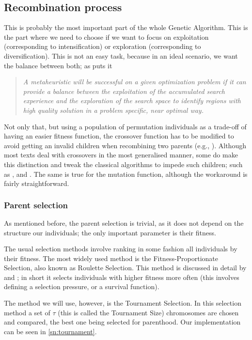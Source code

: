 \subsection{Recombination process}\label{sec:recombination}
This is probably the most important part of the whole Genetic Algorithm. This is the part where we need to choose if we want to focus on exploitation (corresponding to intensification) or exploration (corresponding to diversification). This is not an easy task, because in an ideal scenario, we want the balance between both; as \textcite{Stutzle1999} puts it
\begin{quotation}
	\emph{A metaheuristic will be successful on a given optimization problem if it can provide a balance between the exploitation of the accumulated search experience and the exploration of the search space to identify regions with high quality solution in a problem specific, near optimal way.}
\end{quotation}

Not only that, but using a population of permutation individuals as a trade-off of having an easier fitness function, the crossover function has to be modified to avoid getting an invalid children when recombining two parents (e.g., \inline{[1 1 0 3]}). Although most texts deal with crossovers in the most generalised manner, some do make this distinction and tweak the classical algorithms to impede such children; such as \textcite{Gendreau2010}, and \textcite{Goldberg1989}. The same is true for the mutation function, although the workaround is fairly straightforward.

\subsubsection*{Parent selection}%
As mentioned before, the parent selection is trivial, as it does not depend on the structure our individuals; the only important parameter is their fitness.

The usual selection methods involve ranking in some fashion all individuals by their fitness. The most widely used method is the Fitness-Proportionate Selection, also known as Roulette Selection. This method is discussed in detail by \textcite{Sean2010} and \textcite{Gendreau2010}; in short it selects individuals with higher fitness more often (this involves defining a selection pressure, or a survival function).

The method we will use, however, is the Tournament Selection. In this selection method a set of $\tau$ (this is called the Tournament Size) chromosomes are chosen and compared, the best one being selected for parenthood. Our implementation can be seen in \cref{sn:tournament}.

